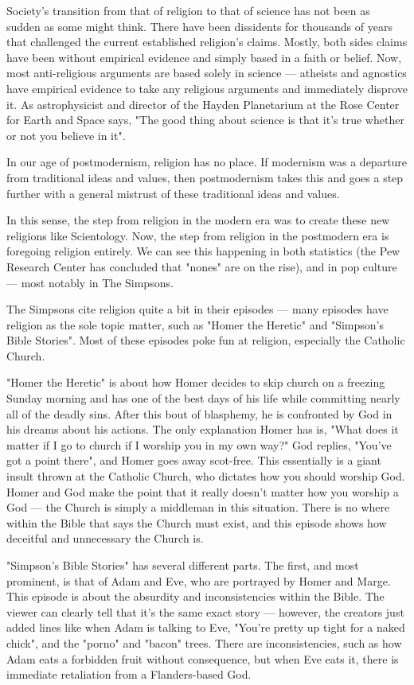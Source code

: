 \documentclass[12pt]{article}
\begin{document}
\begin{flushleft}
Society's transition from that of religion to that of science has not been as sudden as some might think. There have been dissidents for thousands of years that challenged the current established religion's claims. Mostly, both sides claims have been without empirical evidence and simply based in a faith or belief. Now, most anti-religious arguments are based solely in science --- atheists and agnostics have empirical evidence to take any religious arguments and immediately disprove it. As astrophysicist and director of the Hayden Planetarium at the Rose Center for Earth and Space says, "The good thing about science is that it's true whether or not you believe in it". 

In our age of postmodernism, religion has no place. If modernism was a departure from traditional ideas and values, then postmodernism takes this and goes a step further with a general mistrust of these traditional ideas and values.

In this sense, the step from religion in the modern era was to create these new religions like Scientology. Now, the step from religion in the postmodern era is foregoing religion entirely. We can see this happening in both statistics (the Pew Research Center has concluded that "nones" are on the rise), and in pop culture --- most notably in The Simpsons.

The Simpsons cite religion quite a bit in their episodes --- many episodes have religion as the sole topic matter, such as "Homer the Heretic" and "Simpson's Bible Stories". Most of these episodes poke fun at religion, especially the Catholic Church.

"Homer the Heretic" is about how Homer decides to skip church on a freezing Sunday morning and has one of the best days of his life while committing nearly all of the deadly sins. After this bout of blasphemy, he is confronted by God in his dreams about his actions. The only explanation Homer has is, "What does it matter if I go to church if I worship you in my own way?" God replies, "You've got a point there", and Homer goes away scot-free. This essentially is a giant insult thrown at the Catholic Church, who dictates how you should worship God. Homer and God make the point that it really doesn't matter how you worship a God --- the Church is simply a middleman in this situation. There is no where within the Bible that says the Church must exist, and this episode shows how deceitful and unnecessary the Church is.

"Simpson's Bible Stories" has several different parts. The first, and most prominent, is that of Adam and Eve, who are portrayed by Homer and Marge. This episode is about the absurdity and inconsistencies within the Bible. The viewer can clearly tell that it's the same exact story --- however, the creators just added lines like when Adam is talking to Eve, "You're pretty up tight for a naked chick", and the "porno" and "bacon" trees. There are inconsistencies, such as how Adam eats a forbidden fruit without consequence, but when Eve eats it, there is immediate retaliation from a Flanders-based God.


\end{flushleft}
\end{document}
